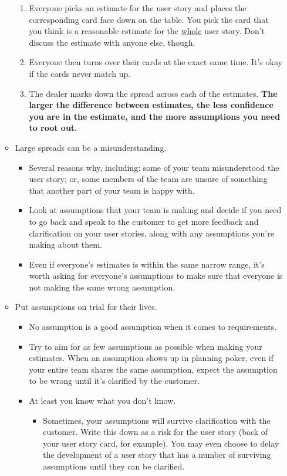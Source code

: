 \documentclass[letterpaper]{article}
\begin{document}
\begin{itemize}
\begin{itemize}
\begin{enumerate}
            \item Everyone picks an estimate for the user story and places the corresponding card face down on the table. You pick the card that you think is a reasonable estimate for the \underline{whole} user story. Don't discuss the estimate with anyone else, though. 
            \item Everyone then turns over their cards at the exact same time. It's okay if the cards never match up. 
            \item The dealer marks down the spread across each of the estimates. \textbf{The larger the difference between estimates, the less confidence you are in the estimate, and the more assumptions you need to root out.}
        \end{enumerate}

        \item Large spreads can be a misunderstanding. 
        \begin{itemize}
            \item Several reasons why, including: some of your team misunderstood the user story; or, some members of the team are unsure of something that another part of your team is happy with. 
            \item Look at assumptions that your team is making and decide if you need to go back and speak to the customer to get more feedback and clarification on your user stories, along with any assumptions you're making about them. 
            \item Even if everyone's estimates is within  the same narrow range, it's worth asking for everyone's assumptions to make sure that everyone is not making the same wrong assumption. 
        \end{itemize}
        \item Put assumptions on trial for their lives. 
        \begin{itemize}
            \item No assumption is a good assumption when it comes to requirements. 
            \item Try to aim for as few assumptions as possible when making your estimates. When an assumption shows up in planning poker, even if your entire team shares the same assumption, expect the assumption to be wrong until it's clarified by the customer. 
            \item At least you know what you don't know. 
            \begin{itemize}
                \item Sometimes, your assumptions will survive clarification with the customer. Write this down as a risk for the user story (back of your user story card, for example). You may even choose to delay the development of a user story that has a number of surviving assumptions until they can be clarified. 

\end{itemize}
\end{itemize}
\end{itemize}
\end{itemize}
\end{document}
